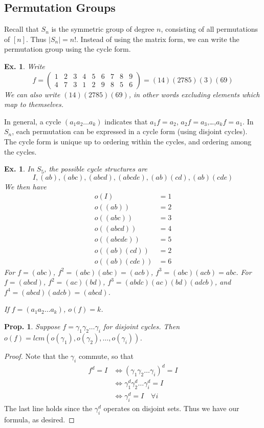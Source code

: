 \documentclass[12pt, a4paper]{book}
\newtheorem{proposition}[theorem]{Prop.}
\newtheorem{example}[theorem]{Ex.}
\theoremstyle{nonumberplain}
\newtheorem{proof}{Proof}
\begin{document}
\subsection{Permutation Groups}
Recall that $S_n$ is the symmetric group of degree $n$, consisting of all permutations of $[n]$.
Thus $|S_n|=n!$.
Instead of using the matrix form, we can write the permutation group using the cycle form.
\begin{example}
    Write
    \[f=\begin{pmatrix}1&2&3&4&5&6&7&8&9\\4&7&3&1&2&9&8&5&6\end{pmatrix}=(14)(2785)(3)(69)\]
    We can also write $(14)(2785)(69)$, in other words excluding elements which map to themselves.
\end{example}
In general, a cycle $(a_1a_2\ldots a_k)$ indicates that $a_1f=a_2$, $a_2f=a_3$,\dots,$a_kf=a_1$.
In $S_n$, each permutation can be expressed in a cycle form (using disjoint cycles).
The cycle form is unique up to ordering within the cycles, and ordering among the cycles.
\begin{example}
    In $S_5$, the possible cycle structures are
    \[I,(ab),(abc),(abcd),(abcde),(ab)(cd),(ab)(cde)\]
    We then have
    \begin{align*}
        o(I) &= 1\\
        o((ab)) &= 2\\
        o((abc)) &= 3\\
        o((abcd)) &= 4\\
        o((abcde)) &= 5\\
        o((ab)(cd)) &= 2\\
        o((ab)(cde)) &= 6
    \end{align*}
    For $f=(abc)$, $f^2=(abc)(abc)=(acb)$, $f^3=(abc)(acb)=abc$.
    For $f=(abcd)$, $f^2=(ac)(bd)$, $f^3=(abdc)(ac)(bd)(adcb)$, and $f^4=(abcd)(adcb)=(abcd)$.

    If $f=(a_1a_2\ldots a_k)$, $o(f)=k$.
\end{example}
\begin{proposition}
    Suppose $f=\gamma_1\gamma_2\ldots\gamma_i$ for disjoint cycles.
    Then $o(f)=lcm(o(\gamma_1),o(\gamma_2),\ldots,o(\gamma_i))$.
\end{proposition}
\begin{proof}
    Note that the $\gamma_i$ commute, so that
    \begin{align*}
        f^d=I &\Leftrightarrow (\gamma_1\gamma_2\ldots\gamma_i)^d=I\\
              &\Leftrightarrow \gamma_1^d\gamma_2^d\ldots\gamma_i^d=I\\
              &\Leftrightarrow \gamma_i^d=I\quad\forall i
    \end{align*}
    The last line holds since the $\gamma_i^d$ operates on disjoint sets.
    Thus we have our formula, as desired.
\end{proof}
\end{document}
